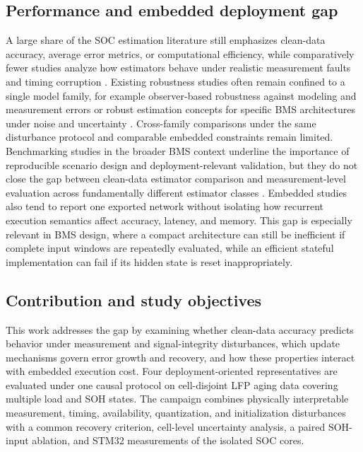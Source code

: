 \documentclass[review,nopreprintline]{elsarticle}
\begin{document}
\subsection{Performance and embedded deployment gap}
A large share of the SOC estimation literature still emphasizes clean-data accuracy, average error metrics, or computational efficiency, while comparatively fewer studies analyze how estimators behave under realistic measurement faults and timing corruption \cite{shrivastavaReviewTechnologicalAdvancement2023,Embedded_AI_only_SOC_mobile,giazitzisCaseStudyTiny2024,mazziStateChargeEstimation2022}. Existing robustness studies often remain confined to a single model family, for example observer-based robustness against modeling and measurement errors \cite{liRobustnessSOCEstimation2015} or robust estimation concepts for specific BMS architectures under noise and uncertainty \cite{naseriReliableWirelessBMS2025}. Cross-family comparisons under the same disturbance protocol and comparable embedded constraints remain limited. Benchmarking studies in the broader BMS context underline the importance of reproducible scenario design and deployment-relevant validation, but they do not close the gap between clean-data estimator comparison and measurement-level evaluation across fundamentally different estimator classes \cite{bergerBenchmarkingBatteryManagement2024}. Embedded studies also tend to report one exported network without isolating how recurrent execution semantics affect accuracy, latency, and memory. This gap is especially relevant in BMS design, where a compact architecture can still be inefficient if complete input windows are repeatedly evaluated, while an efficient stateful implementation can fail if its hidden state is reset inappropriately.

\subsection{Contribution and study objectives}
This work addresses the gap by examining whether clean-data accuracy predicts behavior under measurement and signal-integrity disturbances, which update mechanisms govern error growth and recovery, and how these properties interact with embedded execution cost. Four deployment-oriented representatives are evaluated under one causal protocol on cell-disjoint LFP aging data covering multiple load and SOH states. The campaign combines physically interpretable measurement, timing, availability, quantization, and initialization disturbances with a common recovery criterion, cell-level uncertainty analysis, a paired SOH-input ablation, and STM32 measurements of the isolated SOC cores.
\end{document}
